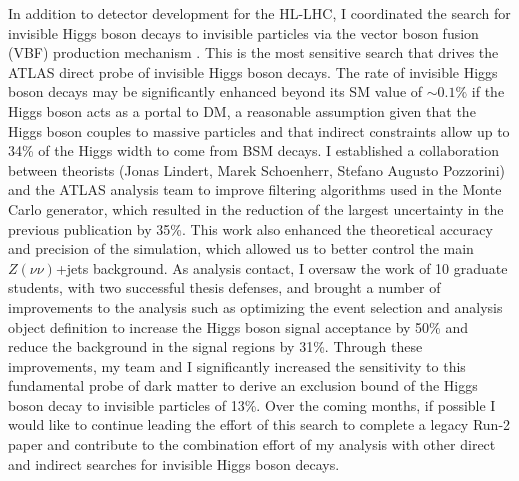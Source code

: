 \documentclass[a4paper]{article}
\begin{document}
In addition to detector development for the HL-LHC, I coordinated the search for invisible Higgs boson decays to invisible particles via the vector boson fusion (VBF) production mechanism  \cite{vbfMET_CONF2020}. This is the most sensitive search that drives the ATLAS direct probe of invisible Higgs boson decays. The rate of invisible Higgs boson decays may be significantly enhanced beyond its SM value of $\sim0.1\%$ if the Higgs boson acts as a portal to DM, a reasonable assumption given that the Higgs boson couples to massive particles and that indirect constraints allow up to 34\% of the Higgs width to come from BSM decays. I established a collaboration between theorists (Jonas Lindert, Marek Schoenherr, Stefano Augusto Pozzorini) and the ATLAS analysis team to improve filtering algorithms used in the Monte Carlo generator, which resulted in the reduction of the largest uncertainty in the previous publication by 35\%. This work also enhanced the theoretical accuracy and precision of the simulation, which allowed us to better control the main $Z\left(\nu\nu\right)$+jets background. As analysis contact, I oversaw the work of 10 graduate students, with two successful thesis defenses, and brought a number of improvements to the analysis such as optimizing the event selection and analysis object definition to increase the Higgs boson signal acceptance by 50\% and reduce the background in the signal regions by 31\%. Through these improvements, my team and I significantly increased the sensitivity to this fundamental probe of dark matter to derive an exclusion bound of the Higgs boson decay to invisible particles of 13\%. Over the coming months, if possible I would like to continue leading the effort of this search to complete a legacy Run-2 paper and contribute to the combination effort of my analysis with other direct and indirect searches for invisible Higgs boson decays.

\bigskip
\end{document}
